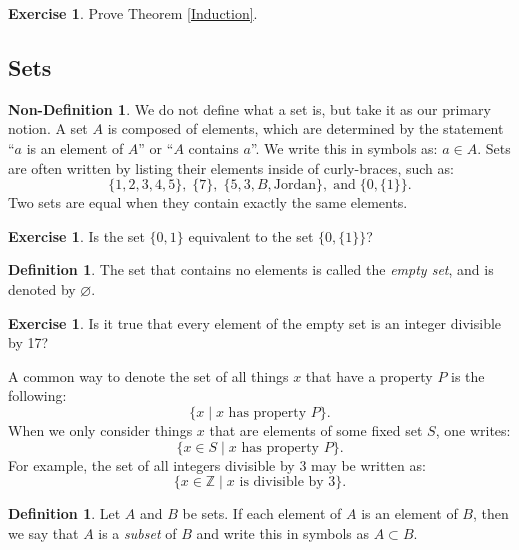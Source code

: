 \documentclass[12pt]{article}
\theoremstyle{definition}
\newtheorem{definition}[theorem]{\color{forrest}Definition}
\newtheorem{nondefinition}[theorem]{\color{forrest}Non-Definition}
\newtheorem{exercise}[theorem]{\color{orange}Exercise}
\numberwithin{equation}{subsection}
\begin{document}
\begin{exercise}
Prove Theorem \ref{Induction}.
\end{exercise}


\subsection*{Sets}

\begin{nondefinition}
We do not define what a set is, but take it as our primary notion.  A set $A$ is composed of elements, which are determined by the statement ``$a$ is an element of $A$'' or ``$A$ contains $a$''.  We write this in symbols as: $a \in A$.  Sets are often written by listing their elements inside of curly-braces, such as:
\[
\{1, 2, 3, 4, 5\}, \; \{ 7\}, \; \{ 5, 3, B, \text{Jordan}\}, \; \text{and} \; \{ 0, \{1 \} \}.
\]
Two sets are equal when they contain exactly the same elements.
\end{nondefinition}

\begin{exercise}
Is the set $\{ 0, 1 \}$ equivalent to the set $\{ 0, \{ 1 \} \}$?
\end{exercise}

\begin{definition}  The set that contains no elements is called the \emph{empty set}, and is denoted by $\varnothing$.
\end{definition}

\begin{exercise}
Is it true that every element of the empty set is an integer divisible by 17?
\end{exercise}

A common way to denote the set of all things $x$ that have a property $P$ is the following:
\[
\{ x \mid \text{$x$ has property $P$} \}.
\]
When we only consider things $x$ that are elements of some fixed set $S$, one writes:
\[
\{ x \in S \mid \text{$x$ has property $P$} \}.
\]
For example, the set of all integers divisible by $3$ may be written as:
\[
\{ x \in \mathbb{Z} \mid \text{$x$ is divisible by $3$} \}.
\]






\begin{definition}  Let $A$ and $B$ be sets.  If each element of $A$ is an element of $B$, then we say that $A$ is a \emph{subset} of $B$ and write this in symbols as $A \subset B$.
\end{definition}
\end{document}
